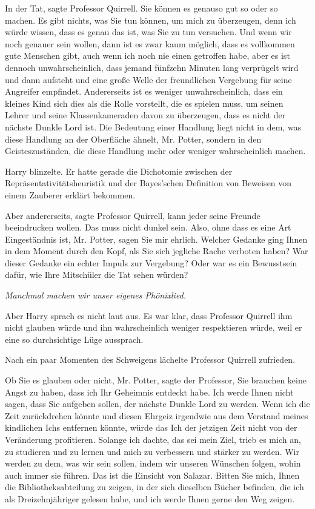 \glqq{}In der Tat\grqq{}, sagte Professor Quirrell. \glqq{}Sie können es genauso
gut so oder so machen. Es gibt nichts, was Sie tun können, um mich zu
überzeugen, denn ich würde wissen, dass es genau das ist, was Sie zu tun
versuchen. Und wenn wir noch genauer sein wollen, dann ist es zwar kaum möglich,
dass es vollkommen gute Menschen gibt, auch wenn ich noch nie einen getroffen
habe, aber es ist dennoch unwahrscheinlich, dass jemand fünfzehn Minuten lang
verprügelt wird und dann aufsteht und eine große Welle der freundlichen
Vergebung für seine Angreifer empfindet. Andererseits ist es weniger
unwahrscheinlich, dass ein kleines Kind sich dies als die Rolle vorstellt, die
es spielen muss, um seinen Lehrer und seine Klassenkameraden davon zu
überzeugen, dass es nicht der nächste Dunkle Lord ist. Die Bedeutung einer
Handlung liegt nicht in dem, was diese Handlung an der Oberfläche ähnelt, Mr.
Potter, sondern in den Geisteszuständen, die diese Handlung mehr oder weniger
wahrscheinlich machen.\grqq{}

Harry blinzelte. Er hatte gerade die Dichotomie zwischen der
Repräsentativitätsheuristik und der Bayes'schen Definition von Beweisen von
einem Zauberer erklärt bekommen.

\glqq{}Aber andererseits\grqq{}, sagte Professor Quirrell, \glqq{}kann jeder seine
Freunde beeindrucken wollen. Das muss nicht dunkel sein. Also, ohne dass es eine
Art Eingeständnis ist, Mr. Potter, sagen Sie mir ehrlich. Welcher Gedanke ging
Ihnen in dem Moment durch den Kopf, als Sie sich jegliche Rache verboten haben?
War dieser Gedanke ein echter Impuls zur Vergebung? Oder war es ein Bewusstsein
dafür, wie Ihre Mitschüler die Tat sehen würden?\grqq{}

\emph{Manchmal machen wir unser eigenes Phönixlied.}

Aber Harry sprach es nicht laut aus. Es war klar, dass Professor Quirrell ihm
nicht glauben würde und ihn wahrscheinlich weniger respektieren würde, weil er
eine so durchsichtige Lüge aussprach.

Nach ein paar Momenten des Schweigens lächelte Professor Quirrell zufrieden.

\glqq{}Ob Sie es glauben oder nicht, Mr. Potter\grqq{}, sagte der Professor,
\glqq{}Sie brauchen keine Angst zu haben, dass ich Ihr Geheimnis entdeckt habe.
Ich werde Ihnen nicht sagen, dass Sie aufgeben sollen, der nächste Dunkle Lord
zu werden. Wenn ich die Zeit zurückdrehen könnte und diesen Ehrgeiz irgendwie
aus dem Verstand meines kindlichen Ichs entfernen könnte, würde das Ich der
jetzigen Zeit nicht von der Veränderung profitieren. Solange ich dachte, das sei
mein Ziel, trieb es mich an, zu studieren und zu lernen und mich zu verbessern
und stärker zu werden. Wir werden zu dem, was wir sein sollen, indem wir unseren
Wünschen folgen, wohin auch immer sie führen. Das ist die Einsicht von Salazar.
Bitten Sie mich, Ihnen die Bibliotheksabteilung zu zeigen, in der sich dieselben
Bücher befinden, die ich als Dreizehnjähriger gelesen habe, und ich werde Ihnen
gerne den Weg zeigen.\grqq{}

